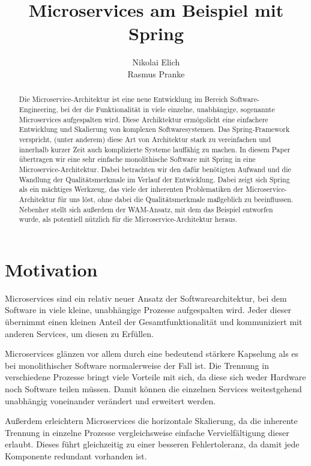 \documentclass{article}
\author{Nikolai Elich \\ Rasmus Pranke}
\title{Microservices am Beispiel mit Spring}
\begin{document}
\maketitle

\begin{abstract}
Die Microservice-Architektur ist eine neue Entwicklung im Bereich Software-Engineering, bei der die Funktionalität in viele einzelne, unabhängige, sogenannte Microservices aufgespalten wird.
Diese Archiktektur ermögolicht eine einfachere Entwicklung und Skalierung von komplexen Softwaresystemen.
Das Spring-Framework verspricht, (unter anderem) diese Art von Architektur stark zu vereinfachen und innerhalb kurzer Zeit auch komplizierte Systeme lauffähig zu machen.
In diesem Paper übertragen wir eine sehr einfache monolithische Software mit Spring in eine Microservice-Architektur.
Dabei betrachten wir den dafür benötigten Aufwand und die Wandlung der Qualitätsmerkmale im Verlauf der Entwicklung.
Dabei zeigt sich Spring als ein mächtiges Werkzeug, das viele der inherenten Problematiken der Microservice-Architektur für uns löst, ohne dabei die Qualitätsmerkmale maßgeblich zu beeinflussen.
Nebenher stellt sich außerdem der WAM-Ansatz, mit dem das Beispiel entworfen wurde, als potentiell nützlich für die Microservice-Architektur heraus.
\end{abstract}

\pagebreak

\tableofcontents

\pagebreak

\section{Motivation}

Microservices sind ein relativ neuer Ansatz der Softwarearchitektur, bei dem Software in viele kleine, unabhängige Prozesse aufgespalten wird.
Jeder dieser übernimmt einen kleinen Anteil der Gesamtfunktionalität und kommuniziert mit anderen Services, um diesen zu Erfüllen.\cite{OMA}

Microservices glänzen vor allem durch eine bedeutend stärkere Kapselung als es bei monolithischer Software normalerweise der Fall ist.
Die Trennung in verschiedene Prozesse bringt viele Vorteile mit sich, da diese sich weder Hardware noch Software teilen müssen.
Damit können die einzelnen Services weitestgehend unabhängig voneinander verändert und erweitert werden.\cite{EMMA}

Außerdem erleichtern Microservices die horizontale Skalierung, da die inherente Trennung in einzelne Prozesse vergleichsweise einfache Vervielfältigung dieser erlaubt.
Dieses führt gleichzeitig zu einer besseren Fehlertoleranz, da damit jede Komponente redundant vorhanden ist.\cite{OMA}
\end{document}

